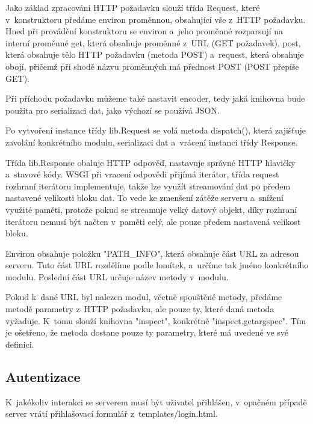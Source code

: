 \documentclass[bc,male,html,dept460]{diploma}				%
\begin{document}
Jako základ zpracování HTTP požadavku slouží třída Request, které v~konstruktoru předáme
environ proměnnou, obsahující vše z~HTTP požadavku.
Hned při provádění konstruktoru se environ a~jeho proměnné rozparsují na interní proměnné get, která obsahuje proměnné z~URL (GET požadavek), post, která obsahuje tělo HTTP požadavku (metoda POST) a~request, která obsahuje obojí, přičemž při shodě názvu proměnných má přednost POST (POST přepíše GET).

Při příchodu požadavku můžeme také nastavit encoder, tedy jaká knihovna bude použita pro serializaci dat, jako výchozí se používá JSON.

Po vytvoření instance třídy lib.Request se volá metoda dispatch(), která zajišťuje zavolání konkrétního modulu,
serializaci dat a~vrácení instanci třídy Response.

Třída lib.Response obaluje HTTP odpověď, nastavuje správné HTTP hlavičky a~stavové kódy.
WSGI při vracení odpovědi přijímá iterátor, třída request rozhraní iterátoru implementuje, takže lze využít streamování dat po předem nastavené velikosti bloku dat. To vede ke zmenšení zátěže serveru a~snížení využité paměti, protože pokud se streamuje velký datový objekt, díky rozhraní iterátoru nemusí být načten v~paměti celý, ale pouze předem nastavená velikost bloku.

Environ obsahuje položku "PATH\_INFO", která obsahuje část URL za adresou serveru. Tuto část URL rozdělíme podle lomítek, a~určíme tak jméno konkrétního modulu.
Poslední část URL určuje název metody v~modulu.

Pokud k~dané URL byl nalezen modul, včetně spouštěné metody, předáme metodě parametry z~HTTP požadavku, ale pouze ty, které daná metoda vyžaduje.
K~tomu slouží knihovna "inspect", konkrétně "inspect.getargspec". Tím je ošetřeno, že metoda dostane pouze ty parametry, které má uvedené ve své definici.


\subsection{Autentizace}
\label{sec:authentization}
K~jakékoliv interakci se serverem musí být uživatel přihlášen, v~opačném případě server vrátí přihlašovací formulář z~templates/login.html.
\end{document}
